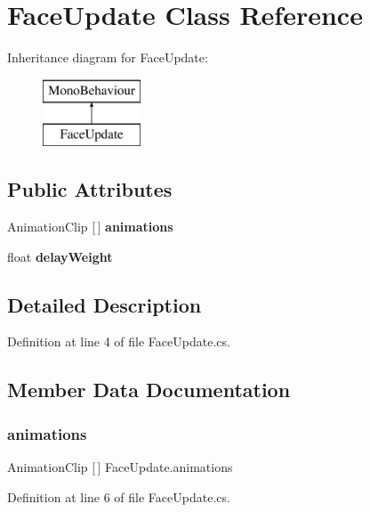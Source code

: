 \section{Face\+Update Class Reference}
\label{class_face_update}
Inheritance diagram for Face\+Update\+:\begin{figure}[H]
\begin{center}
\leavevmode
\includegraphics[height=2.000000cm]{class_face_update}
\end{center}
\end{figure}
\subsection*{Public Attributes}
\begin{DoxyCompactItemize}
\item 
Animation\+Clip [$\,$] \textbf{ animations}
\item 
float \textbf{ delay\+Weight}
\end{DoxyCompactItemize}


\subsection{Detailed Description}


Definition at line 4 of file Face\+Update.\+cs.



\subsection{Member Data Documentation}
\mbox{\label{class_face_update_a8668007f70b5442158207a20f48137c9}} 
\subsubsection{animations}
{\footnotesize\ttfamily Animation\+Clip [$\,$] Face\+Update.\+animations}



Definition at line 6 of file Face\+Update.\+cs.

\mbox{\label{class_face_update_a3b28bd5390170b2acd5234ab5d598efa}} 

